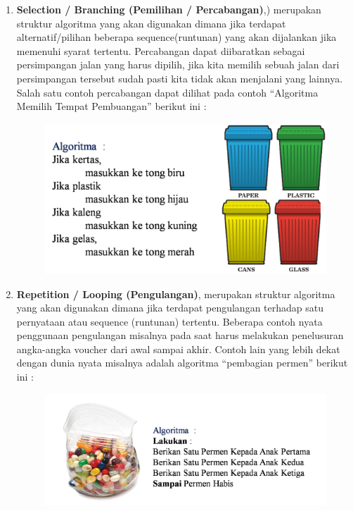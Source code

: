 \begin{enumerate}
	\item \textbf{Selection / Branching (Pemilihan / Percabangan)},) merupakan struktur algoritma yang akan digunakan dimana jika terdapat alternatif/pilihan beberapa sequence(runtunan) yang akan dijalankan jika memenuhi syarat tertentu. Percabangan dapat diibaratkan sebagai persimpangan jalan yang harus dipilih, jika kita memilih sebuah jalan dari persimpangan tersebut sudah pasti kita tidak akan menjalani yang lainnya. Salah satu contoh percabangan dapat dilihat pada contoh “Algoritma Memilih Tempat Pembuangan” berikut ini :  
		\begin{figure}
		\centering
		\includegraphics[scale=0.4]{fig/1/Gambar14.png}	
		\end{figure}
		
	\item \textbf{Repetition / Looping (Pengulangan)}, merupakan struktur algoritma yang akan digunakan dimana jika terdapat pengulangan terhadap satu pernyataan atau sequence (runtunan) tertentu. Beberapa contoh nyata penggunaan pengulangan misalnya pada saat harus melakukan penelusuran angka-angka voucher dari awal sampai akhir. Contoh lain yang lebih dekat dengan dunia nyata misalnya adalah algoritma “pembagian permen” berikut ini :
		\begin{figure}
		\centering
		\includegraphics[scale=0.4]{fig/1/Gambar15.png}	
		\end{figure}
\end{enumerate}

